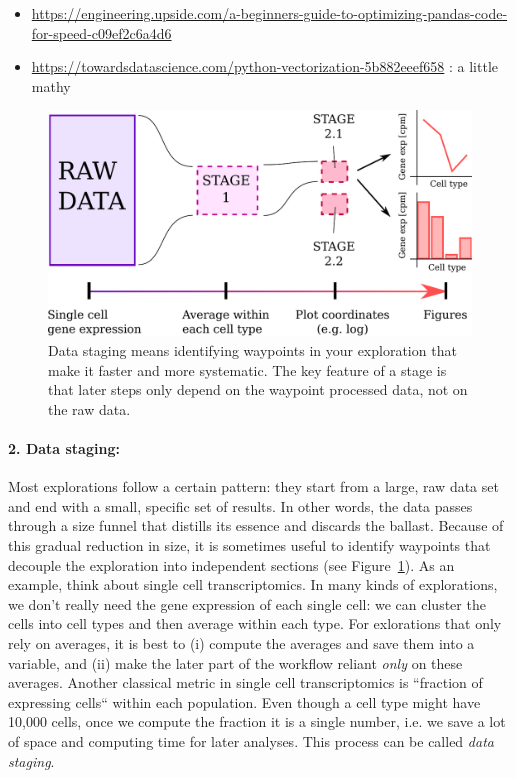 \documentclass[12pt,a4paper,notitlepage,onecolumn]{article}
\begin{document}
{\scriptsize
\begin{itemize}
\item \url{https://engineering.upside.com/a-beginners-guide-to-optimizing-pandas-code-for-speed-c09ef2c6a4d6}
\item \url{https://towardsdatascience.com/python-vectorization-5b882eeef658} {\normalsize : a little mathy}
\end{itemize}
}

\begin{figure}[hb]
\begin{center}
\includegraphics[width=0.8\linewidth]{datastaging.pdf}
\caption{Data staging means identifying waypoints in your exploration that make it faster and more systematic. The key feature of a stage is that later steps only depend on the waypoint processed data, not on the raw data.}
\label{fig:datastaging}
\end{center}
\end{figure}
\paragraph{2. Data staging:} Most explorations follow a certain pattern: they start from a large, raw data set and end with a small, specific set of results. In other words, the data passes through a size funnel that distills its essence and discards the ballast. Because of this gradual reduction in size, it is sometimes useful to identify waypoints that decouple the exploration into independent sections (see Figure~\ref{fig:datastaging}). As an example, think about single cell transcriptomics. In many kinds of explorations, we don't really need the gene expression of each single cell: we can cluster the cells into cell types and then average within each type. For exlorations that only rely on averages, it is best to (i) compute the averages and save them into a variable, and (ii) make the later part of the workflow reliant \textit{only} on these averages. Another classical metric in single cell transcriptomics is ``fraction of expressing cells`` within each population. Even though a cell type might have 10,000 cells, once we compute the fraction it is a single number, i.e. we save a lot of space and computing time for later analyses. This process can be called \textit{data staging}.
\end{document}
